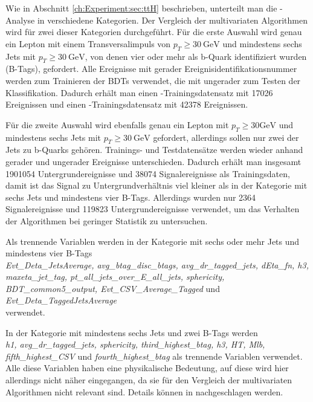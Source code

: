 Wie in Abschnitt \ref{ch:Experiment:sec:ttH} beschrieben, unterteilt man die \ttH-Analyse in verschiedene Kategorien. Der Vergleich der multivariaten Algorithmen wird f\"ur zwei dieser Kategorien durchgef\"uhrt. F\"ur die erste Auswahl wird genau ein Lepton mit einem Transversalimpuls von $p_T\geq \num{30}~\si{\giga\electronvolt}$ und mindestens sechs Jets mit $p_T\geq \num{30}~\si{\giga\electronvolt}$, von denen vier oder mehr als b-Quark identifiziert wurden (B-Tags), gefordert. Alle Ereignisse mit gerader Ereignisidentifikationsnummer werden zum Trainieren der BDTs verwendet, die mit ungerader zum Testen der Klassifikation. Dadurch erh\"alt man einen \ttH-Trainingsdatensatz mit 17026 Ereignissen und einen \ttb-Trainingsdatensatz mit 42378 Ereignissen.

F\"ur die zweite Auswahl wird ebenfalls genau ein Lepton mit $p_T\geq \num{30} \si{\giga\electronvolt}$ und mindestens sechs Jets mit $p_T\geq \num{30}~\si{\giga\electronvolt}$ gefordert, allerdings sollen nur zwei der Jets zu b-Quarks geh\"oren. Trainings- und Testdatens\"atze werden wieder anhand gerader und ungerader Ereignisse unterschieden. Dadurch erh\"alt man insgesamt 1901054 Untergrundereignisse und 38074 Signalereignisse als Trainingsdaten, damit ist das Signal zu Untergrundverh\"altnis viel kleiner als in der Kategorie mit sechs Jets und mindestens vier B-Tags. Allerdings wurden nur 2364 Signalereignisse und 119823 Untergrundereignisse verwendet, um das Verhalten der Algorithmen bei geringer Statistik zu untersuchen. 

Als trennende Variablen werden in der Kategorie mit sechs oder mehr Jets und mindestens vier B-Tags\\
{\it Evt\_Deta\_JetsAverage, avg\_btag\_disc\_btags, avg\_dr\_tagged\_jets, dEta\_fn, h3, maxeta\_jet\_tag, pt\_all\_jets\_over\_E\_all\_jets, sphericity, BDT\_common5\_output, Evt\_CSV\_Average\_Tagged} und {\it Evt\_Deta\_TaggedJetsAverage}\\verwendet.

In der Kategorie mit mindestens sechs Jets und zwei B-Tags werden \\ {\it h1, avg\_dr\_tagged\_jets, sphericity, third\_highest\_btag, h3, HT, Mlb, fifth\_highest\_CSV} und {\it fourth\_highest\_btag} als trennende Variablen verwendet.\\
Alle diese Variablen haben eine physikalische Bedeutung, auf diese wird hier allerdings nicht n\"aher eingegangen, da sie f\"ur den Vergleich der multivariaten Algorithmen nicht relevant sind. Details k\"onnen in \cite{CMS-PAS-HIG-16-004} nachgeschlagen werden.

